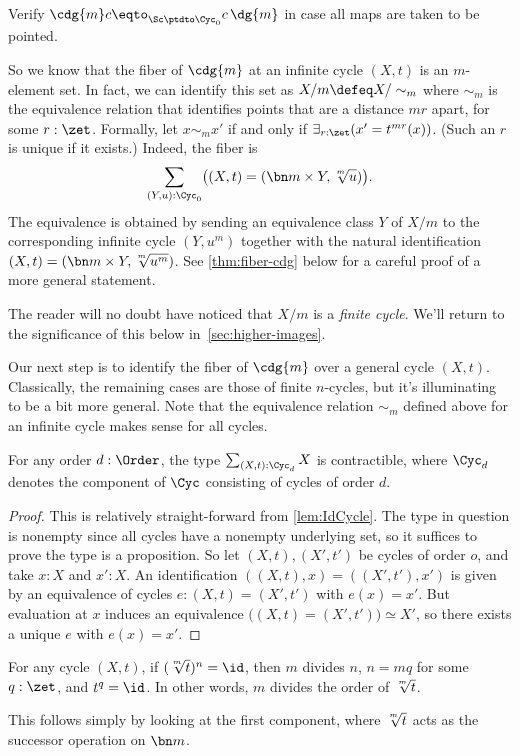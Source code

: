 \begin{xca}\label{xca:pointed-maps-circle}
Verify $\cdg{m}c\eqto_{\Sc\ptdto\Cyc_0}c\,\dg{m}$ in case all maps are taken to be pointed.
\end{xca}

So we know that the fiber of $\cdg{m}$ at an infinite cycle $(X,t)$
is an $m$-element set. In fact, we can identify this set as
$X/m \defeq X/\sim_m$ where $\sim_m$ is the equivalence relation that
identifies points that are a distance $mr$ apart, for some $r:\zet$.
Formally, let $x\sim_m x'$ if and only if $\exists_{r:\zet}(x'=t^{mr}(x))$.
(Such an $r$ is unique if it exists.)
Indeed, the fiber is
\[
  \sum_{(Y,u):\Cyc_0}\bigl((X,t) = (\bn m\times Y, \sqrt[\uproot{2}m]{u})\bigr).
\]
The equivalence is obtained by sending an equivalence class $Y$ of $X/m$ to
the corresponding infinite cycle $(Y,u^m)$ together with the
natural identification $(X,t) = (\bn m\times Y, \sqrt[\uproot{2}m]{u^m})$.
See \cref{thm:fiber-cdg} below for a careful proof of a more general statement.

The reader will no doubt have noticed that $X/m$ is a \emph{finite cycle}.
We'll return to the significance of this below in~\cref{sec:higher-images}.

Our next step is to identify the fiber of $\cdg{m}$ over a general cycle $(X,t)$.
Classically, the remaining cases are those of finite $n$-cycles,
but it's illuminating to be a bit more general.
Note that the equivalence relation $\sim_m$ defined above for an infinite cycle
makes sense for all cycles.

\begin{lemma}\label{lem:sum-cycle-point-contr}
  For any order $d:\Order$, the type $\sum_{(X,t):\Cyc_d}X$ is contractible,
  where $\Cyc_d$ denotes the component of $\Cyc$ consisting
  of cycles of order $d$.
\end{lemma}
\begin{proof}
  This is relatively straight-forward from \cref{lem:IdCycle}.
  The type in question is nonempty since all cycles have a nonempty underlying set,
  so it suffices to prove the type is a proposition.
  So let $(X,t),(X',t')$ be cycles of order $o$, and take $x:X$ and $x':X$.
  An identification $((X,t),x) = ((X',t'),x')$ is given by an equivalence of
  cycles $e : (X,t)=(X',t')$ with $e(x)=x'$.
  But evaluation at $x$ induces an equivalence
  $\bigl((X,t)=(X',t')\bigr) \simeq X'$,
  so there exists a unique $e$ with $e(x)=x'$.
\end{proof}
\begin{lemma}\label{lem:m-root-id}
  For any cycle $(X,t)$, if $(\sqrt[\uproot{2}m]{t})^n = \id$,
  then $m$ divides $n$, \ie $n=mq$ for some $q:\zet$, and $t^q=\id$.
  In other words, $m$ divides the order of $\sqrt[\uproot{2}m]{t}$.
\end{lemma}
This follows simply by looking at the first component,
where $\sqrt[\uproot{2}m]{t}$ acts as the successor operation on $\bn m$.


